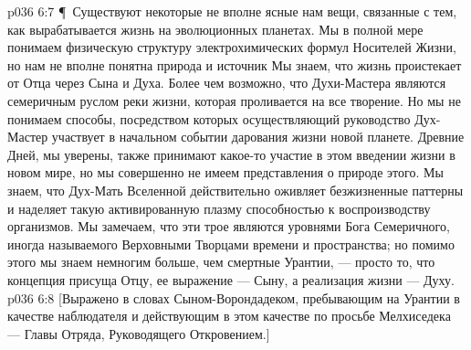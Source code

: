 \vs p036 6:7 \P\ Существуют некоторые не вполне ясные нам вещи, связанные с тем, как вырабатывается жизнь на эволюционных планетах. Мы в полной мере понимаем физическую структуру электрохимических формул Носителей Жизни, но нам не вполне понятна природа и источник  Мы знаем, что жизнь проистекает от Отца через Сына и  Духа. Более чем возможно, что Духи\hyp{}Мастера являются семеричным руслом реки жизни, которая проливается на все творение. Но мы не понимаем способы, посредством которых осуществляющий руководство Дух\hyp{}Мастер участвует в начальном событии дарования жизни новой планете. Древние Дней, мы уверены, также принимают какое\hyp{}то участие в этом введении жизни в новом мире, но мы совершенно не имеем представления о природе этого. Мы знаем, что Дух\hyp{}Мать Вселенной действительно оживляет безжизненные паттерны и наделяет такую активированную плазму способностью к воспроизводству организмов. Мы замечаем, что эти трое являются уровнями Бога Семеричного, иногда называемого Верховными Творцами времени и пространства; но помимо этого мы знаем немногим больше, чем смертные Урантии, --- просто то, что концепция присуща Отцу, ее выражение --- Сыну, а реализация жизни --- Духу.
\vs p036 6:8 [Выражено в словах Сыном\hyp{}Ворондадеком, пребывающим на Урантии в качестве наблюдателя и действующим в этом качестве по просьбе Мелхиседека --- Главы Отряда, Руководящего Откровением.]
